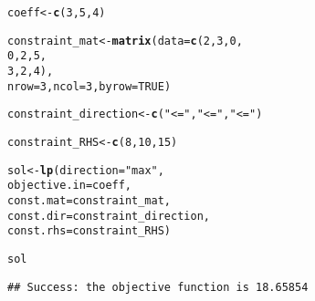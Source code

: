 \documentclass[11pt, a4paper]{article}\usepackage[]{graphicx}\usepackage[]{xcolor}
\makeatletter
\newcommand{\hlnum}[1]{\textcolor[rgb]{0.686,0.059,0.569}{#1}}%
\newcommand{\hlsng}[1]{\textcolor[rgb]{0.192,0.494,0.8}{#1}}%
\newcommand{\hldef}[1]{\textcolor[rgb]{0.345,0.345,0.345}{#1}}%
\newcommand{\hlkwb}[1]{\textcolor[rgb]{0.69,0.353,0.396}{#1}}%
\newcommand{\hlkwc}[1]{\textcolor[rgb]{0.333,0.667,0.333}{#1}}%
\newcommand{\hlkwd}[1]{\textcolor[rgb]{0.737,0.353,0.396}{\textbf{#1}}}%
\newenvironment{kframe}{%
 \def\at@end@of@kframe{}%
 \ifinner\ifhmode%
  \def\at@end@of@kframe{\end{minipage}}%
  \begin{minipage}{\columnwidth}%
 \fi\fi%
 \def\FrameCommand##1{\hskip\@totalleftmargin \hskip-\fboxsep
 \colorbox{shadecolor}{##1}\hskip-\fboxsep
     \hskip-\linewidth \hskip-\@totalleftmargin \hskip\columnwidth}%
 \MakeFramed {\advance\hsize-\width
   \@totalleftmargin\z@ \linewidth\hsize
   \@setminipage}}%
 {\par\unskip\endMakeFramed%
 \at@end@of@kframe}
\newenvironment{knitrout}{}{} %
\makeatother
\begin{document}
\begin{knitrout}
\color{fgcolor}\begin{kframe}
\begin{alltt}
\hldef{coeff} \hlkwb{<-} \hlkwd{c}\hldef{(}\hlnum{3}\hldef{,} \hlnum{5}\hldef{,} \hlnum{4}\hldef{)}

\hldef{constraint_mat} \hlkwb{<-} \hlkwd{matrix}\hldef{(}\hlkwc{data} \hldef{=} \hlkwd{c}\hldef{(}\hlnum{2}\hldef{,} \hlnum{3}\hldef{,} \hlnum{0}\hldef{,}
                                  \hlnum{0}\hldef{,} \hlnum{2}\hldef{,} \hlnum{5}\hldef{,}
                                  \hlnum{3}\hldef{,} \hlnum{2}\hldef{,} \hlnum{4}\hldef{),}
                         \hlkwc{nrow} \hldef{=} \hlnum{3}\hldef{,} \hlkwc{ncol} \hldef{=} \hlnum{3}\hldef{,} \hlkwc{byrow} \hldef{=} \hlnum{TRUE}\hldef{)}

\hldef{constraint_direction} \hlkwb{<-} \hlkwd{c}\hldef{(}\hlsng{"<="}\hldef{,} \hlsng{"<="}\hldef{,} \hlsng{"<="}\hldef{)}

\hldef{constraint_RHS} \hlkwb{<-} \hlkwd{c}\hldef{(}\hlnum{8}\hldef{,} \hlnum{10}\hldef{,} \hlnum{15}\hldef{)}
\end{alltt}
\end{kframe}
\end{knitrout}

\begin{knitrout}
\color{fgcolor}\begin{kframe}
\begin{alltt}
\hldef{sol} \hlkwb{<-} \hlkwd{lp}\hldef{(}\hlkwc{direction} \hldef{=} \hlsng{"max"}\hldef{,}
   \hlkwc{objective.in} \hldef{= coeff,}
   \hlkwc{const.mat} \hldef{= constraint_mat,}
   \hlkwc{const.dir} \hldef{= constraint_direction,}
   \hlkwc{const.rhs} \hldef{= constraint_RHS)}
\end{alltt}
\end{kframe}
\end{knitrout}

\begin{knitrout}
\color{fgcolor}\begin{kframe}
\begin{alltt}
\hldef{sol}
\end{alltt}
\begin{verbatim}
## Success: the objective function is 18.65854
\end{verbatim}
\end{kframe}
\end{knitrout}
\end{document}
